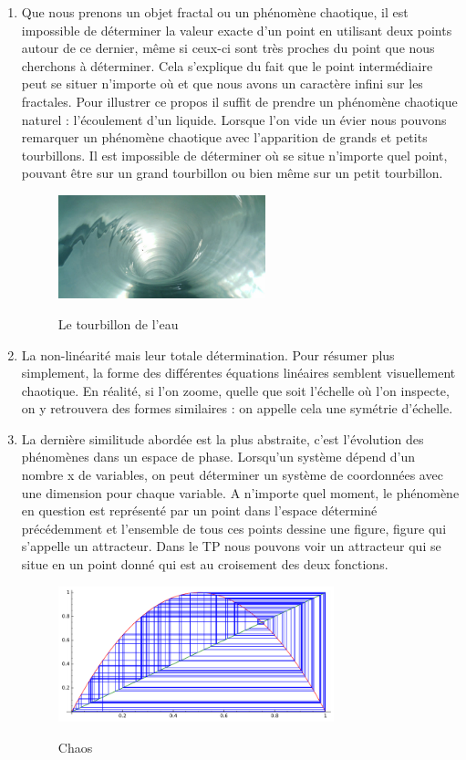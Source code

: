 \documentclass[french,11pt]{report}
\begin{document}
\begin{enumerate}
    \item Que nous prenons un objet fractal ou un phénomène chaotique, il est impossible de déterminer la valeur exacte d’un point en utilisant deux points autour de ce dernier, même si ceux-ci sont très proches du point que nous cherchons à déterminer.  Cela s’explique du fait que le point intermédiaire peut se situer n’importe où et que nous avons un caractère infini sur les fractales.
    Pour illustrer ce propos il suffit de prendre un phénomène chaotique naturel : l’écoulement d’un liquide. Lorsque l’on vide un évier nous pouvons remarquer un phénomène chaotique avec l’apparition de grands et petits tourbillons. Il est impossible de déterminer où se situe n’importe quel point, pouvant être sur un grand tourbillon ou bien même sur un petit tourbillon.
    \begin{figure} [!h]
    \centering
    \includegraphics[width=6cm]{tourbillon}
    \label{fig:tourbillon}
    \caption{Le tourbillon de l'eau}
    \end{figure}
    \item La non-linéarité mais leur totale détermination. Pour résumer plus simplement, la forme des différentes équations linéaires semblent visuellement chaotique. En réalité, si l’on zoome, quelle que soit l’échelle où l’on inspecte, on y retrouvera des formes similaires : on appelle cela une symétrie d’échelle.
    \item La dernière similitude abordée est la plus abstraite, c’est l’évolution des phénomènes dans un espace de phase. Lorsqu’un système dépend d’un nombre x de variables, on peut déterminer un système de coordonnées avec une dimension pour chaque variable. A n’importe quel moment, le phénomène en question est représenté par un point dans l’espace déterminé précédemment et l’ensemble de tous ces points dessine une figure, figure qui s’appelle un attracteur.
    Dans le TP nous pouvons voir un attracteur qui se situe en un point donné qui est au croisement des deux fonctions.
    \begin{figure} [!h]
        \centering
        \includegraphics[width=8cm]{chaos}
        \label{fig:chaos}
        \caption{Chaos}
    \end{figure}


\end{enumerate}
\end{document}
